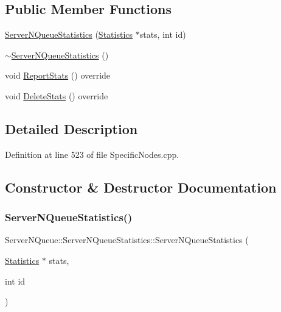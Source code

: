 \subsection*{Public Member Functions}
\begin{DoxyCompactItemize}
\item 
\hyperlink{class_server_n_queue_1_1_server_n_queue_statistics_afe1101a9301d90716165751ec1fe422d}{Server\+N\+Queue\+Statistics} (\hyperlink{class_generic_node_1_1_statistics}{Statistics} $\ast$stats, int id)
\item 
\hyperlink{class_server_n_queue_1_1_server_n_queue_statistics_af13ff99a897621817d5cd9399408cf2f}{$\sim$\+Server\+N\+Queue\+Statistics} ()
\item 
void \hyperlink{class_server_n_queue_1_1_server_n_queue_statistics_a65e23fedacbcba37a1033a690d7b10fd}{Report\+Stats} () override
\item 
void \hyperlink{class_server_n_queue_1_1_server_n_queue_statistics_ade4ec4cac903d382590362780a94b14d}{Delete\+Stats} () override
\end{DoxyCompactItemize}


\subsection{Detailed Description}


Definition at line 523 of file Specific\+Nodes.\+cpp.



\subsection{Constructor \& Destructor Documentation}
\mbox{\label{class_server_n_queue_1_1_server_n_queue_statistics_afe1101a9301d90716165751ec1fe422d}} 
\subsubsection{\texorpdfstring{Server\+N\+Queue\+Statistics()}{ServerNQueueStatistics()}}
{\footnotesize\ttfamily Server\+N\+Queue\+::\+Server\+N\+Queue\+Statistics\+::\+Server\+N\+Queue\+Statistics (\begin{DoxyParamCaption}\item[{\hyperlink{class_generic_node_1_1_statistics}{Statistics} $\ast$}]{stats,  }\item[{int}]{id }\end{DoxyParamCaption})\hspace{0.3cm}{\ttfamily [inline]}}



